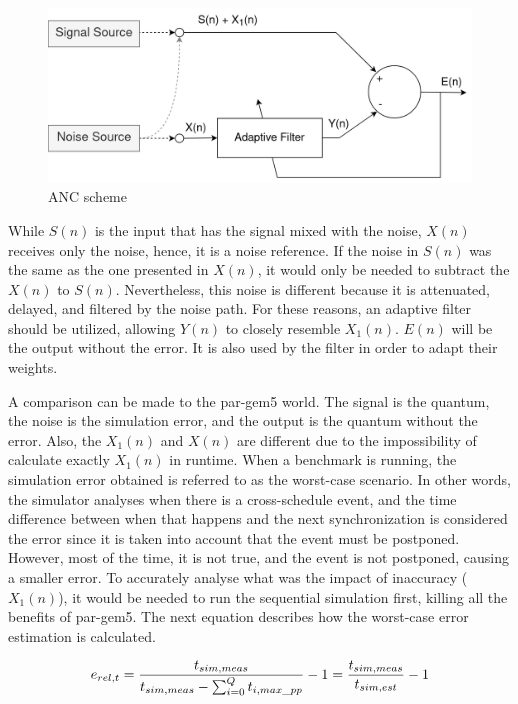 \begin{figure}[H]
	\centering
 	\includegraphics[width=0.7\linewidth]{Images/AdaptiveNoiseCancellationScheme.png}
 	\caption{ANC scheme}
	 \label{fig_AdaptiveNoiseCancellationScheme}
\end{figure}

While $S(n)$ is the input that has the signal mixed with the noise, $X(n)$ receives only the noise, hence, it is a noise reference. If the noise 
in $S(n)$ was the same as the one presented in $X(n)$, it would only be needed to subtract the $X(n)$ to $S(n)$. Nevertheless, this noise is 
different because it is attenuated, delayed, and filtered by the noise path. For these reasons, an adaptive filter should be utilized, allowing 
$Y(n)$ to closely resemble $X_{1}(n)$. $E(n)$ will be the output without the error. It is also used by the filter in order to adapt their weights.

A comparison can be made to the par-gem5 world. The signal is the quantum, the noise is the simulation error, and the output is the quantum 
without the error. Also, the $X_{1}(n)$ and $X(n)$ are different due to the impossibility of calculate exactly $X_{1}(n)$ in runtime. When a 
benchmark is running, the simulation error obtained is referred to as the worst-case scenario. In other words, the simulator analyses when there 
is a cross-schedule event, and the time difference between when that happens and the next synchronization is considered the error since it 
is taken into account that the event must be postponed. However, most of the time, it is not true, and the event is not postponed, causing a smaller error. To 
accurately analyse what was the impact of inaccuracy ($X_{1}(n)$), it would be needed to run the sequential simulation first, killing 
all the benefits of par-gem5. The next equation describes how the worst-case error estimation is calculated. 

\begin{equation}
    \label{eq_errSim}
    \centering
        \Large
        e_{rel,t} = \frac{t_{sim,meas}}{t_{sim,meas}-\sum_{i=0}^{Q}t_{i,max\_pp}} -1  = \frac{t_{sim,meas}}{t_{sim,est}}-1
        \normalsize
\end{equation}
\vspace{0.3cm}

